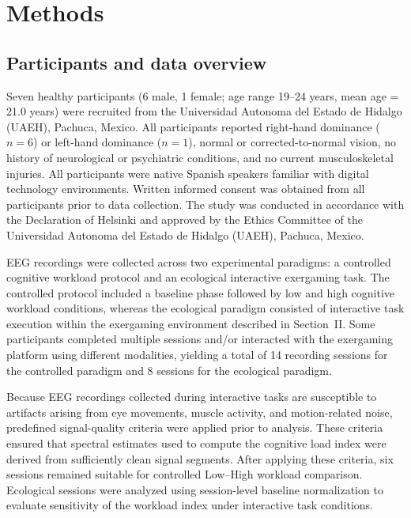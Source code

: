\documentclass[10pt]{iopart}
\begin{document}
\section{Methods}

\subsection{Participants and data overview}

Seven healthy participants (6 male, 1 female; age range 19--24
years, mean age = 21.0 years) were recruited from the Universidad
Autonoma del Estado de Hidalgo (UAEH), Pachuca, Mexico. All
participants reported right-hand dominance ($n = 6$) or
left-hand dominance ($n = 1$), normal or corrected-to-normal
vision, no history of neurological or psychiatric conditions,
and no current musculoskeletal injuries. All participants were
native Spanish speakers familiar with digital technology
environments. Written informed consent was obtained from all
participants prior to data collection. The study was conducted
in accordance with the Declaration of Helsinki and approved by
the Ethics Committee of the Universidad Autonoma del Estado de
Hidalgo (UAEH), Pachuca, Mexico.

EEG recordings were collected across two experimental paradigms:
a controlled cognitive workload protocol and an ecological
interactive exergaming task. The controlled protocol included a
baseline phase followed by low and high cognitive workload
conditions, whereas the ecological paradigm consisted of
interactive task execution within the exergaming environment
described in Section~II. Some participants completed multiple
sessions and/or interacted with the exergaming platform using
different modalities, yielding a total of 14 recording sessions
for the controlled paradigm and 8 sessions for the ecological
paradigm.

Because EEG recordings collected during interactive tasks are
susceptible to artifacts arising from eye movements, muscle
activity, and motion-related noise, predefined signal-quality
criteria were applied prior to analysis. These criteria ensured
that spectral estimates used to compute the cognitive load index
were derived from sufficiently clean signal segments. After
applying these criteria, six sessions remained suitable for
controlled Low--High workload comparison. Ecological sessions
were analyzed using session-level baseline normalization to
evaluate sensitivity of the workload index under interactive
task conditions.
\end{document}
